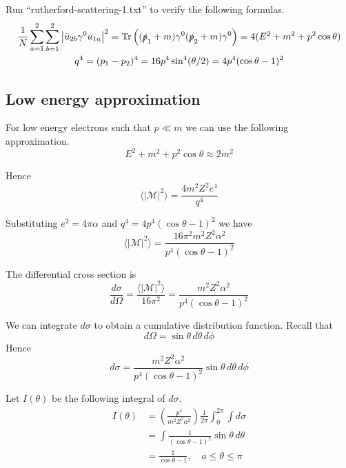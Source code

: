 \documentclass[12pt]{article}
\begin{document}
\noindent
Run ``rutherford-scattering-1.txt'' to verify the following formulas.
\begin{gather*}
\frac{1}{N}\sum_{a=1}^2\sum_{b=1}^2\left|\bar{u}_{2b}\gamma^0 u_{1a}\right|^2
=\mathop{\rm Tr}\left((\slashed{p}_1+m)\gamma^0(\slashed{p}_2+m)\gamma^0\right)
=4(E^2+m^2+p^2\cos\theta)
\\
q^4=(p_1-p_2)^4=16p^4\sin^4(\theta/2)=4p^4(\cos\theta-1)^2
\end{gather*}

\subsection*{Low energy approximation}
For low energy electrons such that $p\ll m$ we can use the following approximation.
\begin{equation*}
E^2+m^2+p^2\cos\theta\approx2m^2
\end{equation*}

\noindent
Hence
\begin{equation*}
\langle|\mathcal{M}|^2\rangle=\frac{4m^2Z^2e^4}{q^4}
\end{equation*}

\noindent
Substituting $e^2=4\pi\alpha$ and $q^4=4p^4(\cos\theta-1)^2$ we have
\begin{equation*}
\langle|\mathcal{M}|^2\rangle=\frac{16\pi^2m^2Z^2\alpha^2}{p^4(\cos\theta-1)^2}
\end{equation*}

\noindent
The differential cross section is
\begin{equation*}
\frac{d\sigma}{d\Omega}=\frac{\langle|\mathcal{M}|^2\rangle}{16\pi^2}
=\frac{m^2Z^2\alpha^2}{p^4(\cos\theta-1)^2}
\end{equation*}

\noindent
We can integrate $d\sigma$ to obtain a cumulative distribution function.
Recall that
\begin{equation*}
d\Omega=\sin\theta\,d\theta\,d\phi
\end{equation*}
Hence
\begin{equation*}
d\sigma=\frac{m^2Z^2\alpha^2}{p^4(\cos\theta-1)^2}\sin\theta\,d\theta\,d\phi
\end{equation*}

\noindent
Let $I(\theta)$ be the following integral of $d\sigma$.
\begin{align*}
I(\theta)
&=\left(\frac{p^4}{m^2Z^2\alpha^2}\right)\frac{1}{2\pi}\int_0^{2\pi}\int d\sigma
\\
&=\int\frac{1}{(\cos\theta-1)^2}\sin\theta\,d\theta
\\
&=\frac{1}{\cos\theta-1},\quad a\le\theta\le\pi
\end{align*}
\end{document}
